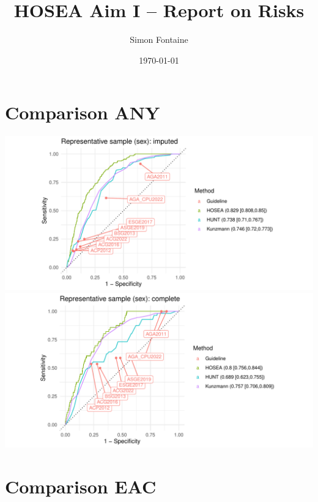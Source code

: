 \documentclass[12pt]{article}
\title{HOSEA Aim I -- Report on Risks}
\author{Simon Fontaine}
\date{\today}
\begin{document}
\maketitle


\section*{Comparison ANY}


\begin{center}
\includegraphics[width=1.0\textwidth]{figures/comparison_ANY_sex_imputed.pdf}
\includegraphics[width=1.0\textwidth]{figures/comparison_ANY_sex_complete.pdf}
\end{center}

\clearpage
\newpage

\section*{Comparison EAC}
\end{document}

